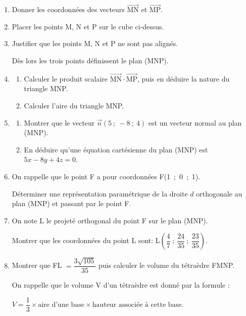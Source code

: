 \documentclass[10pt]{article}
\providecommand{\vect}[1]{\overrightarrow{#1}}
\begin{document}
\begin{enumerate}
\item Donner les coordonnées des vecteurs $\vect{\text{MN}}$ et $\vect{\text{MP}}$.
\item Placer les points M, N et P sur le cube ci-dessus.
\item Justifier que les points M, N et P ne sont pas alignés. 

Dès lors les trois points définissent le plan (MNP).
\item 
	\begin{enumerate}
		\item Calculer le produit scalaire $\vect{\text{MN}} \cdot \vect{\text{MP}}$, puis en déduire la nature du triangle MNP.
		\item Calculer l'aire du triangle MNP.
	\end{enumerate}
\item 
	\begin{enumerate}
		\item Montrer que le vecteur $\vect{n}(5~;~-8~;~4)$ est un vecteur normal au plan (MNP).
		\item En déduire qu'une équation cartésienne du plan (MNP) est $5x - 8y + 4z = 0$.
	\end{enumerate}	
\item On rappelle que le point F a pour coordonnées F(1~;~0~;~1). 

Déterminer une représentation paramétrique de la droite $d$ orthogonale au plan (MNP) et passant par le point F.
\item On note L le projeté orthogonal du point F sur le plan (MNP). 

Montrer que les coordonnées du point L sont: L$\left(\dfrac47~;~\dfrac{24}{35}~;~\dfrac{23}{35}\right)$.
\item Montrer que FL $= \dfrac{3\sqrt{105}}{35}$ puis calculer le volume du tétraèdre FMNP. 

On rappelle que le volume V d'un tétraèdre est donné par la formule :

\begin{center}$V = \dfrac13 \times  \text{aire d'une base} \times \text{hauteur associée à cette base}$.\end{center}

\end{enumerate}

\medskip
\end{document}
